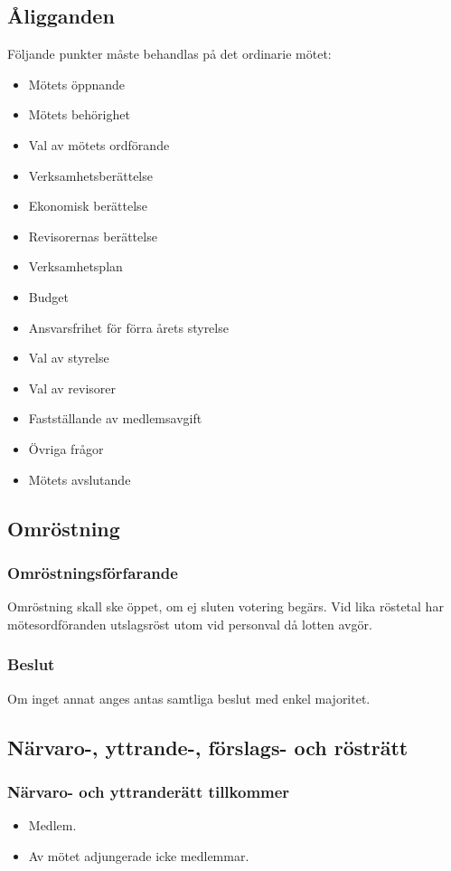 \subsection{Åligganden}
Följande punkter måste behandlas på det ordinarie mötet:
\begin{itemize}
	\item Mötets öppnande
	\item Mötets behörighet
	\item Val av mötets ordförande
	\item Verksamhetsberättelse
	\item Ekonomisk berättelse
	\item Revisorernas berättelse
	\item Verksamhetsplan
	\item Budget
	\item Ansvarsfrihet för förra årets styrelse
	\item Val av styrelse
	\item Val av revisorer
	\item Fastställande av medlemsavgift
	\item Övriga frågor
	\item Mötets avslutande
\end{itemize}

\subsection{Omröstning}
\subsubsection{Omröstningsförfarande}
Omröstning skall ske öppet, om ej sluten votering begärs. Vid lika röstetal har mötesordföranden utslagsröst utom vid personval då lotten avgör.

\subsubsection{Beslut}
Om inget annat anges antas samtliga beslut med enkel majoritet. 

\subsection{Närvaro-, yttrande-, förslags- och rösträtt}
\subsubsection{Närvaro- och yttranderätt tillkommer}
\begin{itemize} 
	\item Medlem.
	\item Av mötet adjungerade icke medlemmar.
\end{itemize}

